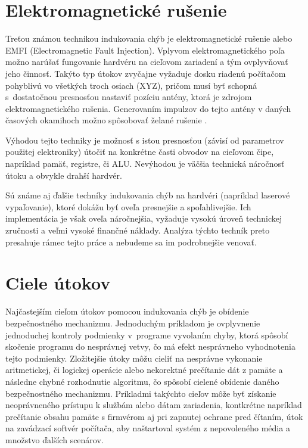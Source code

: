 \section{Elektromagnetické rušenie}
Treťou známou technikou indukovania chýb je elektromagnetické rušenie alebo EMFI (Electromagnetic Fault Injection). Vplyvom elektromagnetického poľa možno narúšať fungovanie hardvéru na cieľovom zariadení a tým ovplyvňovať jeho činnosť. Takýto typ útokov zvyčajne vyžaduje dosku riadenú počítačom pohyblivú vo všetkých troch osiach (XYZ), pričom musí byť schopná s~dostatočnou presnosťou nastaviť pozíciu antény, ktorá je zdrojom elektromagnetického rušenia. Generovaním impulzov do tejto antény v daných časových okamihoch možno spôsobovať želané rušenie \cite{emfi}.

Výhodou tejto techniky je možnosť s istou presnosťou (závisí od parametrov použitej elektroniky) útočiť na konkrétne časti obvodov na cieľovom čipe, napríklad pamäť, registre, či ALU. Nevýhodou je väčšia technická náročnosť útoku a obvykle drahší hardvér.

Sú známe aj ďalšie techníky indukovania chýb na hardvéri (napríklad laserové vypaľovanie), ktoré dokážu byť oveľa presnejšie a spoľahlivejšie. Ich implementácia je však oveľa náročnejšia, vyžaduje vysokú úroveň technickej zručnosti a veľmi vysoké finančné náklady. Analýza týchto techník preto presahuje rámec tejto práce a nebudeme sa im podrobnejšie venovať.

\section{Ciele útokov}
Najčastejším cieľom útokov pomocou indukovania chýb je obídenie bezpečnostného mechanizmu. Jednoduchým príkladom je ovplyvnenie jednoduchej kontroly podmienky v~programe vyvolaním chyby, ktorá spôsobí skočenie programu do nesprávnej vetvy, čo má efekt nesprávneho vyhodnotenia tejto podmienky. Zložitejšie útoky môžu cieliť na nesprávne vykonanie aritmetickej, či logickej operácie alebo nekorektné prečítanie dát z pamäte a následne chybné rozhodnutie algoritmu, čo spôsobí cielené obídenie daného bezpečnostného mechanizmu. Príkladmi takýchto cieľov môže byť získanie neoprávneného prístupu k službám alebo dátam zariadenia, kontkrétne napríklad prečítanie obsahu pamäte s firmvérom aj pri zapnutej ochrane pred čítaním, útok na zavádzací softvér počítača, aby naštartoval systém z nepovoleného média a množstvo ďalších scenárov.

